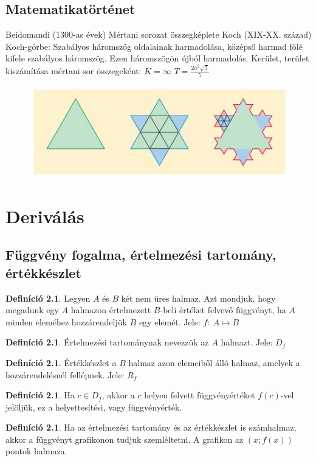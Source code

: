 \documentclass[twoside,12pt]{report}
\theoremstyle{definition}
\newtheorem{definition}[theorem]{Definíció}
\begin{document}
\section{Matematikatörténet}
	\begin{outline}
		\1 Beidomandi (1300-as évek)
			\2 Mértani sorozat összegképlete
		\1 Koch (XIX-XX. század)
			\2 Koch-görbe: Szabályos háromszög oldalainak harmadolása, középső harmad fölé kifele szabályos háromszög. Ezen háromszögön újból harmadolás. Kerület, terület kiszámítása mértani sor összegeként:
				\3 $K=\infty$
				\3 $T=\frac{2a^2\sqrt{3}}{5}$
			\2[] \begin{figure}[H]
				\centering
				\includegraphics[width=0.8\linewidth]{Koch}
			\end{figure}
	\end{outline}
\chapter{Deriválás}
\section{Függvény fogalma, értelmezési tartomány, értékkészlet}
	\begin{definition}
		Legyen $A$ és $B$ két nem üres halmaz. Azt mondjuk, hogy megadunk egy $A$ halmazon értelmezett $B$-beli értéket felvevő függvényt, ha $A$ minden eleméhez hozzárendeljük $B$ egy elemét. Jele: $f:\ A\mapsto B$
	\end{definition}
	\begin{definition}
		Értelmezési tartománynak nevezzük az $A$ halmazt. Jele: $D_f$
	\end{definition}
	\begin{definition}
		Értékkészlet a $B$ halmaz azon elemeiből álló halmaz, amelyek a hozzárendelésnél fellépnek. Jele: $R_f$
	\end{definition}
	\begin{definition}
		Ha $c\in D_f$, akkor a $c$ helyen felvett függvényértéket $f(c)$-vel jelöljük, ez a helyettesítési, vagy függvényérték.
	\end{definition}
	\begin{definition}
		Ha az értelmezési tartomány és az értékkészlet is számhalmaz, akkor a függvényt grafikonon tudjuk szemléltetni. A grafikon az $(x;f(x))$ pontok halmaza.
	\end{definition}
\end{document}
